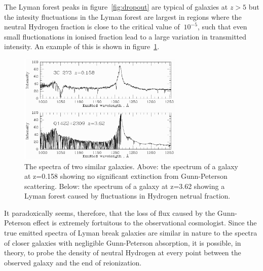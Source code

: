 		The Lyman forest peaks in figure~\ref{fig:dropout} are typical of galaxies at $z>5$ but the intesity fluctuations in the Lyman forest are largest in regions where the neutral Hydrogen fraction is close to the critical value of $~10^{-5}$, such that even small fluctionations in ionised fraction lead to a large variation in transmitted intensity. An example of this is shown in figure~\ref{fig:forest}.
		\begin{figure}[htbp]
			\centering
			\includegraphics[width=0.7\textwidth]{../Images/forest.png}
			\caption{The spectra of two similar galaxies. Above: the spectrum of a galaxy at z=0.158 showing no significant extinction from Gunn-Peterson scattering. Below: the spectrum of a galaxy at z=3.62 showing a Lyman forest caused by fluctuations in Hydrogen netrual fraction.}
			\label{fig:forest}
		\end{figure}

		It paradoxically seems, therefore, that the loss of flux caused by the Gunn-Peterson effect is extremely fortuitous to the observational cosmologist. Since the true emitted spectra of Lyman break galaxies are similar in nature to the spectra of closer galaxies with negligible Gunn-Peterson absorption, it is possible, in theory, to probe the density of neutral Hydrogen at every point between the observed galaxy and the end of reionization.

